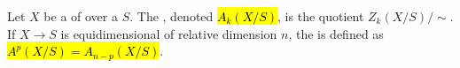 \begin{definition} \label{definition:relative_chow_groups_of_a_finite_type_scheme_over_a_noetherian_base}
Let $X$ be a  of  over a  $S$. The , denoted \hl{$A_k(X/S)$}, is the quotient $Z_k(X/S) / \sim$. 
If $X \to S$ is equidimensional of relative dimension $n$, the  is defined as \hl{$A^p(X/S) = A_{n-p}(X/S)$}.
\end{definition}